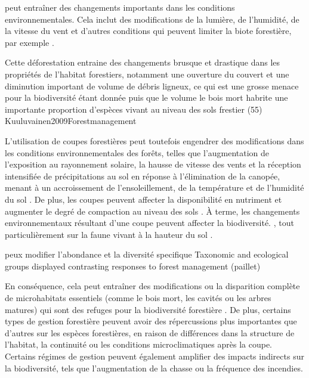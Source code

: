 peut entraîner des changements importants dans les conditions environnementales. Cela inclut des modifications de la lumière, de l'humidité, de la vitesse du vent et d'autres conditions qui peuvent limiter la biote forestière, par exemple \citep{Heithecker2007Edgerelatedgradients}.

Cette déforestation entraine des changements brusque et drastique dans les propriétés de l'habitat forestiers, notamment une ouverture du couvert et une diminution important de volume de débris ligneux, ce qui est une grosse menace pour la biodiversité étant donnée puis que le volume le bois mort habrite une importante proportion d'espèces vivant au niveau des sols frestier (55) Kuuluvainen2009Forestmanagement

L'utilisation de coupes forestières peut toutefois engendrer des modifications dans les conditions environnementales des forêts, 
telles que l'augmentation de l'exposition au rayonnement solaire, la hausse de vitesse des vents et la réception intensifiée de précipitations au sol en réponse à l'élimination de la canopée, 
menant à un accroissement de l'ensoleillement, de la température et de l'humidité du sol \citep{Keenan1993ecologicaleffects,Lindo2003Microbialbiomass,Heithecker2007Edgerelatedgradients}.
De plus, les coupes peuvent affecter la disponibilité en nutriment et augmenter le degré de compaction au niveau des sols \citep{Covington1981Changesforest,Lindo2003Microbialbiomass,Battigelli2004Shorttermimpact,rousseauLongtermEffectsBiomass2018}. 
À terme, les changements environnementaux résultant d'une coupe peuvent affecter la biodiversité. \citep{Paillet2010Biodiversitydifferences,Fedrowitz2014Canretention,Chaudhary2016Impactforest}, 
tout particulièrement sur la faune vivant à la hauteur du sol \citep{Lindo2003Microbialbiomass,Chaudhary2016Impactforest,Kudrin2023metaanalysiseffects}.

peux modifier l'abondance et la diversité specifique
Taxonomic and ecological groups displayed contrasting responses to forest management (paillet)

En conséquence, cela peut entraîner des modifications ou la disparition complète de microhabitats essentiels (comme le bois mort, les cavités ou les arbres matures) qui sont des refuges pour la biodiversité forestière \citep{Paillet2010Biodiversitydifferences}. 
De plus, certains types de gestion forestière peuvent avoir des répercussions plus importantes que d'autres sur les espèces forestières, en raison de différences dans la structure de l'habitat, la continuité ou les conditions microclimatiques après la coupe. 
Certains régimes de gestion peuvent également amplifier des impacts indirects sur la biodiversité, tels que l'augmentation de la chasse ou la fréquence des incendies.


